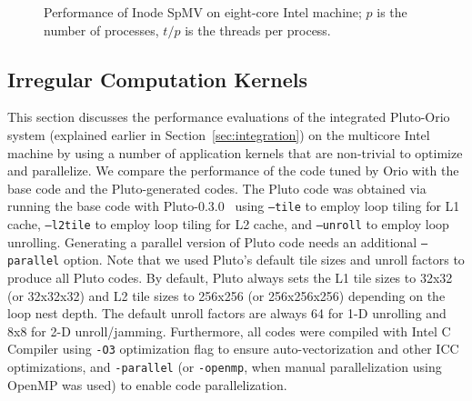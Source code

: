 \begin{figure} [thb]
\begin{center} 
    
\end{center}
\vspace{-.2in} 
\caption{Performance of Inode SpMV on eight-core Intel machine; $p$ is the number of processes, $t/p$ is the threads per process.} 
\label{fig:ex27-cookie-results} 
\end{figure} 

\subsection{Irregular Computation Kernels} 

This section discusses the performance evaluations of the integrated
Pluto-Orio system (explained earlier in Section~\ref{sec:integration})
on the multicore Intel machine by using a number of application
kernels that are non-trivial to optimize and parallelize. We compare
the performance of the code tuned by Orio with the base code and the
Pluto-generated codes. The Pluto code was obtained via running the
base code with Pluto-0.3.0~\cite{pluto030} using \texttt{--tile} to
employ loop tiling for L1 cache,
\texttt{--l2tile} to employ loop tiling for L2 cache, and
\texttt{--unroll} to employ loop unrolling. Generating a parallel
version of Pluto code needs an additional \texttt{--parallel}
option. Note that we used Pluto's default tile sizes and unroll
factors to produce all Pluto codes. By default, Pluto always sets the
L1 tile sizes to 32x32 (or 32x32x32) and L2 tile sizes to 256x256 (or
256x256x256) depending on the loop nest depth. The default unroll
factors are always 64 for 1-D unrolling and 8x8 for 2-D
unroll/jamming. Furthermore, all codes were compiled with Intel C
Compiler using \texttt{-O3} optimization flag to ensure
auto-vectorization and other ICC optimizations, and \texttt{-parallel}
(or \texttt{-openmp}, when manual parallelization using OpenMP was
used) to enable code parallelization.
 
